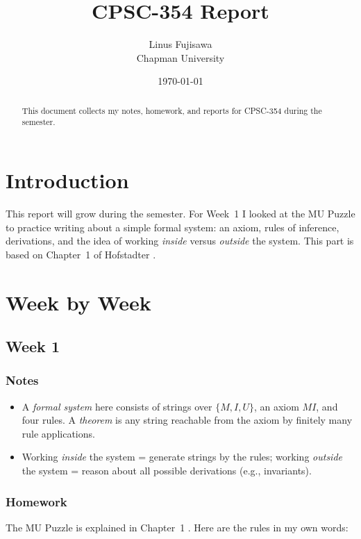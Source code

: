 \documentclass{article}
\title{CPSC-354 Report}
\author{Linus Fujisawa \\ Chapman University}
\date{\today}
\theoremstyle{theorem}
\theoremstyle{definition}
\theoremstyle{remark}
\begin{document}
\maketitle

\begin{abstract}
This document collects my notes, homework, and reports for CPSC-354 during the semester.
\end{abstract}

\setcounter{tocdepth}{3}
\tableofcontents

\section{Introduction}\label{intro}
This report will grow during the semester. For Week~1 I looked at the MU Puzzle to practice writing about a simple formal system: an axiom, rules of inference, derivations, and the idea of working \emph{inside} versus \emph{outside} the system. This part is based on Chapter~1 of Hofstadter \cite{heb}.

\section{Week by Week}\label{homework}

\subsection{Week 1}

\subsubsection{Notes}
\begin{itemize}
  \item A \emph{formal system} here consists of strings over $\{M,I,U\}$, an axiom $MI$, and four rules. A \emph{theorem} is any string reachable from the axiom by finitely many rule applications.
  \item Working \emph{inside} the system = generate strings by the rules; working \emph{outside} the system = reason about all possible derivations (e.g., invariants).
\end{itemize}

\subsubsection{Homework}
The MU Puzzle is explained in Chapter~1 \cite{heb}. Here are the rules in my own words:
\end{document}
